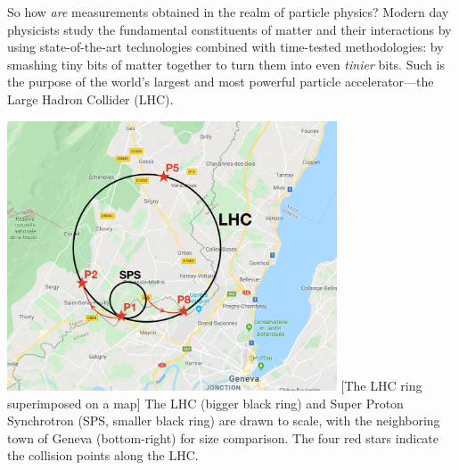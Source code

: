 So how \emph{are} measurements obtained in the realm of particle physics?
Modern day physicists study the fundamental constituents of matter and their interactions by using state-of-the-art technologies combined with time-tested methodologies:
by smashing tiny bits of matter together to turn them into even \emph{tinier} bits.
Such is the purpose of the world's largest and most powerful particle accelerator---the Large Hadron Collider (LHC).
\begin{multiFigure}
    \centering
    \includegraphics[height=8cm]{figures/lhc/lhc_drawn_on_map_withpoints.png}
        [The LHC ring superimposed on a map]
        {The LHC (bigger black ring) and Super Proton Synchrotron (SPS, smaller black ring) are drawn to scale, with the neighboring town of Geneva (bottom-right) for size comparison. 
        The four red stars indicate the \pp collision points along the LHC. 
        }
    \label{fig:lhc_on_map}
\end{multiFigure}

